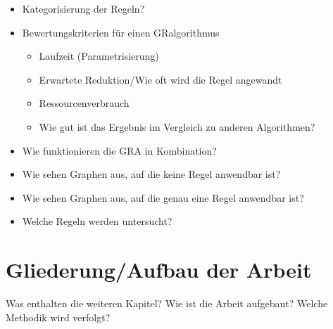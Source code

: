 \begin{itemize}
\item Kategorisierung der Regeln?
\item Bewertungskriterien für einen GRalgorithmus
	\begin{itemize}
	\item Laufzeit (Parametrisierung)
	\item Erwartete Reduktion/Wie oft wird die Regel angewandt
	\item Ressourcenverbrauch
	\item Wie gut ist das Ergebnis im Vergleich zu anderen Algorithmen?	
	\end{itemize}
\item Wie funktionieren die GRA in Kombination?
\item Wie sehen Graphen aus, auf die keine Regel anwendbar ist?
\item Wie sehen Graphen aus, auf die genau eine Regel anwendbar ist?
\item Welche Regeln werden untersucht?
\end{itemize}


\section{Gliederung/Aufbau der Arbeit}
\label{ch:Einleitung:sec:Gliederung}

Was enthalten die weiteren Kapitel? Wie ist die Arbeit aufgebaut? Welche Methodik wird verfolgt?


